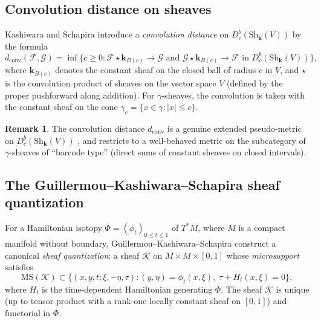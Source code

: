 \documentclass[12pt,a4paper]{amsart}
\theoremstyle{definition}
\newtheorem{remark}[theorem]{Remark}
\newcommand{\kk}{\mathbf{k}}                %
\newcommand{\Sh}{\mathrm{Sh}}               %
\newcommand{\Dbc}{D^b_c}                     %
\newcommand{\MS}{\mathrm{MS}}               %
\newcommand{\conv}{\star}                    %
\newcommand{\dconv}{d_{\mathrm{conv}}}      %
\begin{document}
\subsection{Convolution distance on sheaves}

Kashiwara and Schapira \cite{KS2018} introduce a \emph{convolution
  distance} on $\Dbc(\Sh_\kk(V))$ by the formula
\[
  \dconv(\mathcal{F}, \mathcal{G})
  = \inf \bigl\{ c \geq 0 :
    \mathcal{F} \conv \kk_{B(c)} \to \mathcal{G}
    \text{ and }
    \mathcal{G} \conv \kk_{B(c)} \to \mathcal{F}
    \text{ in } \Dbc(\Sh_\kk(V))
  \bigr\},
\]
where $\kk_{B(c)}$ denotes the constant sheaf on the closed ball of
radius $c$ in $V$, and $\conv$ is the convolution product of sheaves on
the vector space $V$ (defined by the proper pushforward along
addition).  For $\gamma$-sheaves, the convolution is taken with the
constant sheaf on the cone $\gamma_c = \{x \in \gamma : |x| \leq c\}$.

\begin{remark}
  The convolution distance $\dconv$ is a genuine extended pseudo-metric
  on $\Dbc(\Sh_\kk(V))$ \cite[Prop.~2.6]{KS2018}, and restricts to a
  well-behaved metric on the subcategory of $\gamma$-sheaves of
  ``barcode type'' (direct sums of constant sheaves on closed intervals).
\end{remark}

\subsection{The Guillermou--Kashiwara--Schapira sheaf quantization}

For a Hamiltonian isotopy $\Phi = (\phi_t)_{0 \leq t \leq 1}$ of
$T^*M$, where $M$ is a compact manifold without boundary,
Guillermou--Kashiwara--Schapira \cite{GKS2012} construct a canonical
\emph{sheaf quantization}: a sheaf $\mathcal{K}$ on $M \times M \times
[0,1]$ whose \emph{microsupport} satisfies
\[
  \MS(\mathcal{K}) \subset
  \bigl\{(x, y, t; \xi, -\eta, \tau) :
  (y, \eta) = \phi_t(x, \xi),\; \tau + H_t(x, \xi) = 0 \bigr\},
\]
where $H_t$ is the time-dependent Hamiltonian generating $\Phi$.  The
sheaf $\mathcal{K}$ is unique (up to tensor product with a rank-one
locally constant sheaf on $[0,1]$) and functorial in $\Phi$.
\end{document}
